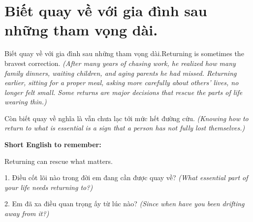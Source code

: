 \section{Biết quay về với gia đình sau những tham vọng dài.}
\begin{truyen}{Biết quay về với gia đình sau những tham vọng dài.}{Returning is sometimes the bravest correction.}
\textit{(After many years of chasing work, he realized how many family dinners, waiting children, and aging parents he had missed. Returning earlier, sitting for a proper meal, asking more carefully about others' lives, no longer felt small. Some returns are major decisions that rescue the parts of life wearing thin.)}
\end{truyen}
\begin{baihoc}
Còn biết quay về nghĩa là vẫn chưa lạc tới mức hết đường cứu.
\textit{(Knowing how to return to what is essential is a sign that a person has not fully lost themselves.)}
\end{baihoc}
\begin{ghinhoanh}
\textbf{Short English to remember:}

Returning can rescue what matters.
\end{ghinhoanh}
\begin{tuhocnhanh}
1. Điều cốt lõi nào trong đời em đang cần được quay về? \textit{(What essential part of your life needs returning to?)}

2. Em đã xa điều quan trọng ấy từ lúc nào? \textit{(Since when have you been drifting away from it?)}
\end{tuhocnhanh}
\ngancach

